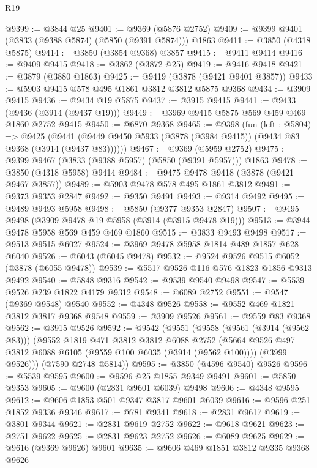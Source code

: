 \begin{lexlean}{R19}
\begin{coremodule}
@9399 := @3844 @25
@9401 := @9369 (@5876 @2752)
@9409 := @9399 @9401 (@3833 (@9388 @5874) (@5850 (@9391 @5874))) @1863
@9411 := @3850 (@4318 @5875)
@9414 := @3850 (@3854 @9368) @3857
@9415 := @9411 @9414
@9416 := @9409 @9415
@9418 := @3862 (@3872 @25)
@9419 := @9416 @9418
@9421 := @3879 (@3880 @1863)
@9425 := @9419 (@3878 (@9421 @9401 @3857))
@9433 := @5903 @9415 @578 @495 @1861 @3812 @3812 @5875 @9368
@9434 := @3909 @9415
@9436 := @9434 @19 @5875
@9437 := @3915 @9415
@9441 := @9433 (@9436 (@3914 (@9437 @19)))
@9449 := @3969 @9415 @5875 @569 @459 @469 @1860 @2752 @9415
@9450 := @6870 @9368
@9465 := @9398
    (fun (left : @5804) =>
    @9425 (@9441 (@9449 @9450 @5933 (@3878 (@3984 @9415)) (@9434 @83 @9368 (@3914 (@9437 @83))))))
@9467 := @9369 (@5959 @2752)
@9475 := @9399 @9467 (@3833 (@9388 @5957) (@5850 (@9391 @5957))) @1863
@9478 := @3850 (@4318 @5958) @9414
@9484 := @9475 @9478 @9418 (@3878 (@9421 @9467 @3857))
@9489 := @5903 @9478 @578 @495 @1861 @3812
@9491 := @9373 @9353 @2847
@9492 := @9350 @9491
@9493 := @9314 @9492
@9495 := @9489 @9493 @5958
@9498 := @5850 (@9377 @9353 @2847)
@9507 := @9495 @9498 (@3909 @9478 @19 @5958 (@3914 (@3915 @9478 @19)))
@9513 := @3944 @9478 @5958 @569 @459 @469 @1860
@9515 := @3833 @9493 @9498
@9517 := @9513 @9515 @6027
@9524 := @3969 @9478 @5958 @1814 @489 @1857 @628 @6040
@9526 := @6043 (@6045 @9478)
@9532 := @9524 @9526 @9515 @6052 (@3878 (@6055 @9478))
@9539 := @5517 @9526 @116 @576 @1823 @1856 @9313 @9492
@9540 := @5848 @9316
@9542 := @9539 @9540 @9498
@9547 := @5539 @9526 @239 @1822 @4179 @9312
@9548 := @6089 @2752
@9551 := @9547 (@9369 @9548) @9540
@9552 := @4348 @9526
@9558 := @9552 @469 @1821 @3812 @3817 @9368 @9548
@9559 := @3909 @9526
@9561 := @9559 @83 @9368
@9562 := @3915 @9526
@9592 := @9542
    (@9551
      (@9558
        (@9561 (@3914 (@9562 @83)))
        (@9552
          @1819
          @471
          @3812
          @3812
          @6088
          @2752
          (@5664 @9526 @497 @3812 @6088 @6105 (@9559 @100 @6035 (@3914 (@9562 @100))))
          (@3999 @9526)))
      (@7590 @2748 @5814))
@9595 := @3850 (@4596 @9540) @9526
@9596 := @5539 @9595
@9600 := @9596 @25 @1855 @9349 @9491
@9601 := @5850 @9353
@9605 := @9600 (@2831 @9601 @6039) @9498
@9606 := @4348 @9595
@9612 := @9606 @1853 @501 @9347 @3817 @9601 @6039
@9616 := @9596 @251 @1852 @9336 @9346
@9617 := @781 @9341
@9618 := @2831 @9617
@9619 := @3801 @9344
@9621 := @2831 @9619 @2752
@9622 := @9618 @9621
@9623 := @2751 @9622
@9625 := @2831 @9623 @2752
@9626 := @6089 @9625
@9629 := @9616 (@9369 @9626) @9601
@9635 := @9606 @469 @1851 @3812 @9335 @9368 @9626

\end{coremodule}
\end{lexlean}
